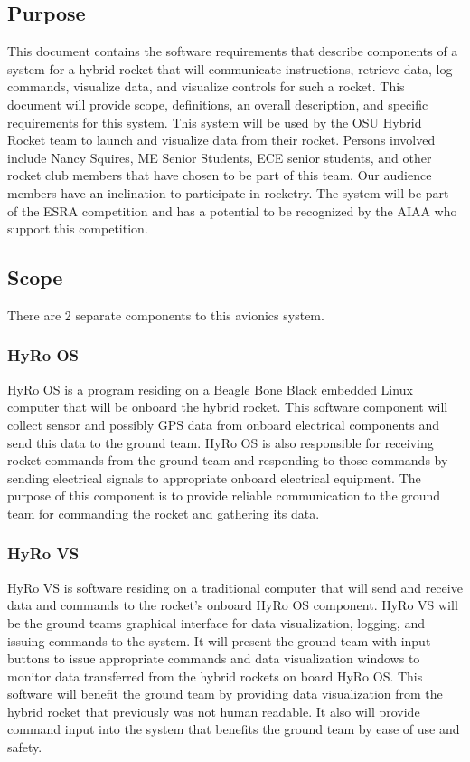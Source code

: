 \documentclass[10pt,draftclsnofoot,onecolumn,retainorgcmds]{IEEEtran}
\begin{document}
\subsection{Purpose}
This document contains the software requirements that describe components of a system for a hybrid rocket that will communicate instructions, retrieve data, log commands,
visualize data, and visualize controls for such a rocket.  This document will provide scope, definitions, an overall description, and specific requirements for this system.
This system will be used by the OSU Hybrid Rocket team to launch and visualize data from their rocket. Persons involved include Nancy Squires, ME Senior Students, ECE senior students,
and other rocket club members that have chosen to be part of this team. Our audience members have an inclination to participate in rocketry. The system will be part of the ESRA
competition and has a potential to be recognized by the AIAA who support this competition.
\subsection{Scope}
There are 2 separate components to this avionics system. 

\subsubsection{HyRo OS}
HyRo OS is a program residing on a Beagle Bone Black embedded Linux computer that will be onboard the hybrid rocket. This software component will collect sensor and possibly
GPS data from onboard electrical components and send this data to the ground team. HyRo OS is also responsible for receiving rocket commands from the ground team and responding to those
commands by sending electrical signals to appropriate onboard electrical equipment. The purpose of this component is to provide reliable communication to the ground team for commanding
the rocket and gathering its data. 
\subsubsection{HyRo VS}
HyRo VS is software residing on a traditional computer that will send and receive data and commands to the rocket's onboard HyRo OS component. HyRo VS will be the ground teams graphical interface for data visualization, logging, and issuing commands to the system. It will present the ground team with input buttons to issue appropriate commands and data visualization windows to monitor data transferred from the hybrid rockets on board HyRo OS. This software will benefit the ground team by providing data visualization from the hybrid rocket that previously was not human readable. It also will provide command input into the system that benefits the ground team by ease of use and safety.
\end{document}
